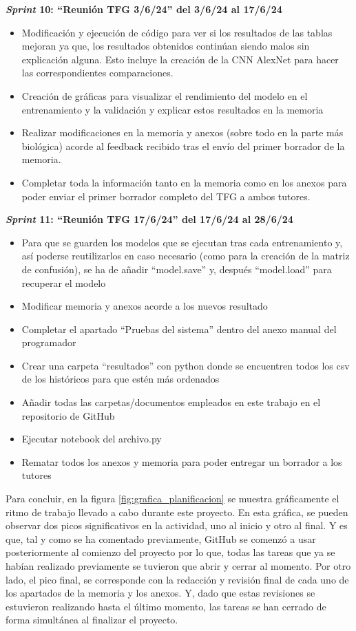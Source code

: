 \textbf{\textit{Sprint} 10: ``Reunión TFG 3/6/24'' del 3/6/24 al 17/6/24}
\begin{itemize}
    \item Modificación y ejecución de código para ver si los resultados de las tablas mejoran ya que, los resultados obtenidos continúan siendo malos sin explicación alguna. Esto incluye la creación de la CNN AlexNet para hacer las correspondientes comparaciones.
    \item Creación de gráficas para visualizar el rendimiento del modelo en el entrenamiento y la validación y explicar estos resultados en la memoria
    \item Realizar modificaciones en la memoria y anexos (sobre todo en la parte más biológica) acorde al feedback recibido tras el envío del primer borrador de la memoria.
    \item Completar toda la información tanto en la memoria como en los anexos para poder enviar el primer borrador completo del TFG a ambos tutores.
    
    

\end{itemize}

\textbf{\textit{Sprint} 11: ``Reunión TFG 17/6/24'' del 17/6/24 al 28/6/24}
\begin{itemize}
    \item Para que se guarden los modelos que se ejecutan tras cada entrenamiento y, así poderse reutilizarlos en caso necesario (como para la creación de la matriz de confusión), se ha de añadir ``model.save'' y, después ``model.load'' para recuperar el modelo
    \item Modificar memoria y anexos acorde a los nuevos resultado
    \item Completar el apartado ``Pruebas del sistema'' dentro del anexo manual del programador
    \item Crear una carpeta ``resultados'' con python donde se encuentren todos los csv de los históricos para que estén más ordenados
    \item Añadir todas las carpetas/documentos empleados en este trabajo en el repositorio de GitHub
    \item Ejecutar notebook del archivo.py
    \item Rematar todos los anexos y memoria para poder entregar un borrador a los tutores
\end{itemize}

Para concluir, en la figura \ref{fig:grafica_planificacion} se muestra gráficamente el ritmo de trabajo llevado a cabo durante este proyecto. En esta gráfica, se pueden observar dos picos significativos en la actividad, uno al inicio y otro al final. Y es que, tal y como se ha comentado previamente, GitHub se comenzó a usar posteriormente al comienzo del proyecto por lo que, todas las tareas que ya se habían realizado previamente se tuvieron que abrir y cerrar al momento. Por otro lado, el pico final, se corresponde con la redacción y revisión final de cada uno de los apartados de la memoria y los anexos. Y, dado que estas revisiones se estuvieron realizando hasta el último momento, las tareas se han cerrado de forma simultánea al finalizar el proyecto.

